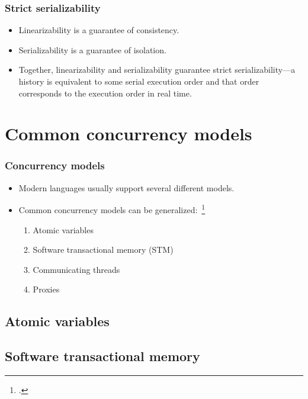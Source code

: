 \documentclass{beamer}
\begin{document}
  \begin{frame}
    \frametitle{Strict serializability}

    \begin{itemize}
      \item Linearizability is a guarantee of consistency.
      \item Serializability is a guarantee of isolation.
      \item Together, linearizability and serializability guarantee strict serializability---a history is equivalent to some serial execution order and that order corresponds to the execution order in real time.
    \end{itemize}
  \end{frame}

  \section{Common concurrency models}

  \begin{frame}
    \frametitle{Concurrency models}

    \begin{itemize}
      \item Modern languages usually support several different models.
      \item Common concurrency models can be generalized:~\footcite{Swalens2014}
      \begin{enumerate}
        \item Atomic variables
        \item Software transactional memory (STM)
        \item Communicating threads
        \item Proxies
      \end{enumerate}
    \end{itemize}
  \end{frame}

  \subsection{Atomic variables}

  \begin{frame}
  \end{frame}

  \subsection{Software transactional memory}
\end{document}
